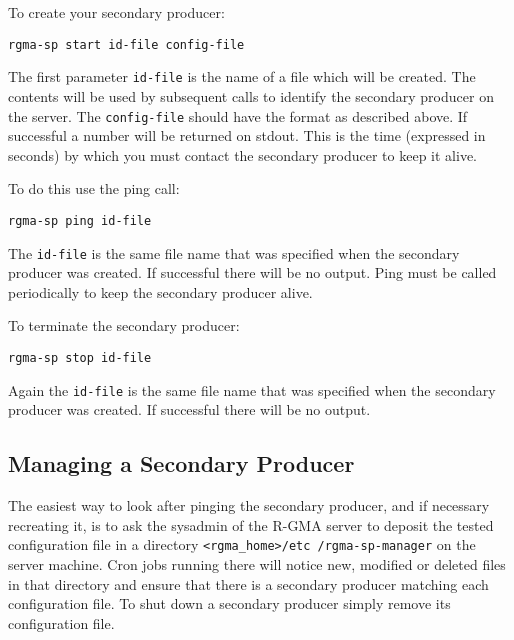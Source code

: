 To create your secondary producer:

\begin{verbatim}
rgma-sp start id-file config-file
\end{verbatim}

The first parameter \texttt{id-file} is the name of a file which will
be created.  The contents will be used by subsequent calls to identify
the secondary producer on the server. The \texttt{config-file} should
have the format as described above. If successful a number will be
returned on stdout. This is the time (expressed in seconds) by which
you must contact the secondary producer to keep it alive.

To do this use the ping call:

\begin{verbatim}
rgma-sp ping id-file
\end{verbatim}

The \texttt{id-file} is the same file name that was specified when the
secondary producer was created. If successful there will be no
output. Ping must be called periodically to keep the secondary
producer alive.

To terminate the secondary producer:

\begin{verbatim}
rgma-sp stop id-file
\end{verbatim}

Again the \texttt{id-file} is the same file name that was specified
when the secondary producer was created. If successful there will be no
output.

\subsection{Managing a Secondary Producer}
\label{sec:rgma-sp-manager}

The easiest way to look after pinging the secondary producer, and if
necessary recreating it, is to ask the sysadmin of the R-GMA server to
deposit the tested configuration file in a directory
\verb!<rgma_home>!\texttt{/etc /rgma-sp-manager} on the server
machine. Cron jobs running there will notice new, modified or deleted
files in that directory and ensure that there is a secondary producer
matching each configuration file. To shut down a secondary producer
simply remove its configuration file.
